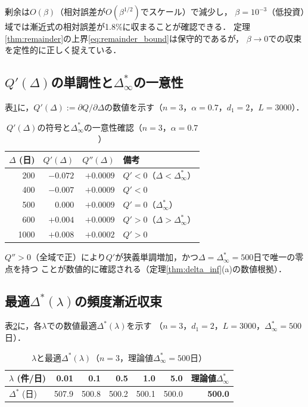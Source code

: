 \documentclass[12pt,a4paper]{article}
\theoremstyle{plain}
\theoremstyle{definition}
\theoremstyle{remark}
\newcommand{\Dopt}{\Delta^{*}}
\newcommand{\Dinf}{\Delta^{*}_{\infty}}
\begin{document}
剰余は$O(\beta)$（相対誤差が$O(\beta^{1/2})$でスケール）で減少し，
$\beta=10^{-3}$（低投資）域では漸近式の相対誤差が1.8\%に収まることが確認できる．
定理\ref{thm:remainder}の上界\eqref{eq:remainder_bound}は保守的であるが，
$\beta\to0$での収束を定性的に正しく捉えている．

\subsection{$Q'(\Delta)$の単調性と$\Dinf$の一意性}

表\ref{tab:Q_convex}に，$Q'(\Delta):=\partial Q/\partial\Delta$の数値を示す（$n=3$，$\alpha=0.7$，$d_1=2$，$L=3000$）．

\begin{table}[h]
\centering
\caption{$Q'(\Delta)$の符号と$\Dinf$の一意性確認（$n=3$，$\alpha=0.7$）}
\label{tab:Q_convex}
\begin{tabular}{@{}rrrl@{}}
\toprule
$\Delta$ (日) & $Q'(\Delta)$ & $Q''(\Delta)$ & 備考 \\
\midrule
200 & $-0.072$ & $+0.0009$ & $Q'<0$（$\Delta<\Dinf$） \\
400 & $-0.007$ & $+0.0009$ & $Q'<0$ \\
500 & $0.000$ & $+0.0009$ & $Q'=0$（$\Dinf$） \\
600 & $+0.004$ & $+0.0009$ & $Q'>0$（$\Delta>\Dinf$） \\
1000 & $+0.008$ & $+0.0002$ & $Q'>0$ \\
\bottomrule
\end{tabular}
\end{table}

$Q''>0$（全域で正）により$Q'$が狭義単調増加，かつ$\Delta=\Dinf=500$日で唯一の零点を持つ
ことが数値的に確認される（定理\ref{thm:delta_inf}(a)の数値根拠）．

\subsection{最適$\Dopt(\lambda)$の頻度漸近収束}

表\ref{tab:delta_lambda}に，各$\lambda$での数値最適$\Dopt(\lambda)$を示す
（$n=3$，$d_1=2$，$L=3000$，$\Dinf=500$日）．

\begin{table}[h]
\centering
\caption{$\lambda$と最適$\Dopt(\lambda)$（$n=3$，理論値$\Dinf=500$日）}
\label{tab:delta_lambda}
\begin{tabular}{@{}lrrrrrr@{}}
\toprule
$\lambda$ (件/日) & 0.01 & 0.1 & 0.5 & 1.0 & 5.0 & 理論値$\Dinf$ \\
\midrule
$\Dopt$ (日) & 507.9 & 500.8 & 500.2 & 500.1 & 500.0 & \textbf{500.0} \\
\bottomrule
\end{tabular}
\end{table}
\end{document}
